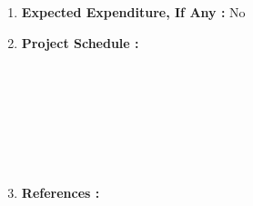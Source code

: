 \documentclass[12pt,a4paper]{article}
\begin{document}
\begin{flushleft}
\begin{enumerate}
		
		\item {\bfseries Expected Expenditure, If Any : } No
		
		
		\clearpage
		
		\item {\bfseries Project Schedule : }
		
			\begin{ganttchart}{1}{24}
				 \\
			
				\\
				
				 \\
				 \\
				 \\
				 \\
			\end{ganttchart}
		
		\item {\bfseries References : }
			
			\nocite{kazemi2014one}
			\nocite{dalal2005histograms}
			\nocite{belhumeur1997eigenfaces}
			\nocite{ahonen2006face}
			\nocite{face}
			\nocite{gender}
			
			

	\end{enumerate}
\end{flushleft}
\end{document}
